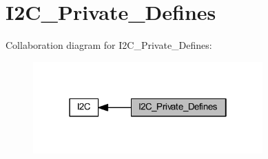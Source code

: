 \hypertarget{group___i2_c___private___defines}{}\section{I2\+C\+\_\+\+Private\+\_\+\+Defines}
\label{group___i2_c___private___defines}
Collaboration diagram for I2\+C\+\_\+\+Private\+\_\+\+Defines\+:
\nopagebreak
\begin{figure}[H]
\begin{center}
\leavevmode
\includegraphics[width=250pt]{group___i2_c___private___defines}
\end{center}
\end{figure}

